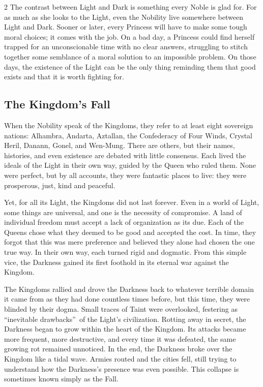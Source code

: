 \begin{multicols}{2}
The contrast between Light and Dark is something every Noble is glad for. For as much as she looks to the Light, even the Nobility live somewhere between Light and Dark. Sooner or later, every Princess will have to make some tough moral choices; it comes with the job. On a bad day, a Princess could find herself trapped for an unconscionable time with no clear answers, struggling to stitch together some semblance of a moral solution to an impossible problem. On those days, the existence of the Light can be the only thing reminding them that good exists and that it is worth fighting for. 

\subsection*{The Kingdom's Fall}%

When the Nobility speak of the Kingdoms, they refer to at least eight sovereign nations: Alhambra, Andarta, Aztallan, the Confederacy of Four Winds, Crystal Heril, Danann, Gonel, and Wen-Mung. There are others, but their names, histories, and even existence are debated with little consensus. Each lived the ideals of the Light in their own way, guided by the Queen who ruled them. None were perfect, but by all accounts, they were fantastic places to live: they were prosperous, just, kind and peaceful. 

Yet, for all its Light, the Kingdoms did not last forever. Even in a world of Light, some things are universal, and one is the necessity of compromise. A land of individual freedom must accept a lack of organization as its due. Each of the Queens chose what they deemed to be good and accepted the cost. In time, they forgot that this was mere preference and believed they alone had chosen the one true way. In their own way, each turned rigid and dogmatic. From this simple vice, the Darkness gained its first foothold in its eternal war against the Kingdom. 

The Kingdoms rallied and drove the Darkness back to whatever terrible domain it came from as they had done countless times before, but this time, they were blinded by their dogma. Small traces of Taint were overlooked, festering as \textquotedblleft inevitable drawbacks\textquotedblright\, of the Light's civilization. Rotting away in secret, the Darkness began to grow within the heart of the Kingdom. Its attacks became more frequent, more destructive, and every time it was defeated, the same growing rot remained unnoticed. In the end, the Darkness broke over the Kingdom like a tidal wave. Armies routed and the cities fell, still trying to understand how the Darkness's presence was even possible. This collapse is sometimes known simply as the Fall.


\end{multicols}
